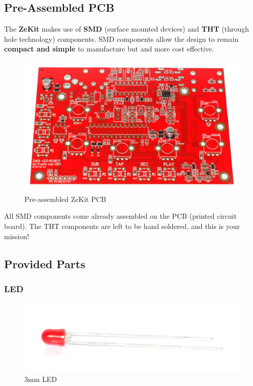 \documentclass{scrartcl}
\begin{document}
\pagebreak
\subsection{Pre-Assembled PCB}

The \textbf{ZeKit} makes use of \textbf{SMD} (surface mounted devices) and \textbf{THT} (through hole technology) components. SMD components allow the design to remain \textbf{compact and simple} to manufacture but and more cost effective.

\begin{figure}[!ht]
    \begin{center}
        \includegraphics[scale=0.10]{assets/zekit-unassembled.jpg}
        \caption{Pre-assembled ZeKit PCB}
    \end{center}
\end{figure}

All SMD components come already assembled on the PCB (printed circuit board). The THT components are left to be hand soldered, and this is your mission!

\subsection{Provided Parts}

\subsubsection{LED}

\begin{figure}[!ht]
    \begin{center}
        \includegraphics[scale=0.15]{assets/zekit-led.jpg}
        \caption{3mm LED}
    \end{center}
\end{figure}
\end{document}
